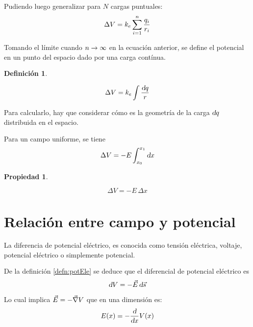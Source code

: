 \documentclass[a5paper,12pt,twoside]{book}
\newtheorem{defn}{{Definición}}[chapter]
\newtheorem{prop}{{Propiedad}}[chapter]
\begin{document}
Pudiendo luego generalizar para $N$ cargas puntuales:
\begin{equation}
    \Delta V = k_e \sum_{i=1}^n \frac{q_i}{r_i}
\end{equation}

Tomando el límite cuando $n\to\infty$ en la ecuación anterior, se define el potencial en un punto del espacio dado por una carga contínua.

\begin{mdframed}[style=MyFrame1]
    \begin{defn}
    \end{defn}
    \begin{equation*}
        \Delta V = k_e \int \frac{\textsl{d} q}{r}
    \end{equation*}
\end{mdframed}

Para calcularlo, hay que considerar cómo es la geometría de la carga $\textsl{d} q$ distribuida en el espacio.

Para un campo uniforme, se tiene
\begin{equation*}
    \Delta V = - E \int_{x_0}^{x_1} \textsl{d} x
\end{equation*}

\begin{mdframed}[style=MyFrame1]
    \begin{prop}
    \end{prop}
    \begin{equation*}
        \Delta V = - E \, \Delta x
    \end{equation*}
\end{mdframed}


\section{Relación entre campo y potencial}

La diferencia de potencial eléctrico, es conocida como tensión eléctrica, voltaje, potencial eléctrico o simplemente potencial.

De la definición \ref{defn:potEle} se deduce que el diferencial de potencial eléctrico es
\begin{equation*}
    \textsl{d} V = - \Vec{E} \, \textsl{d} \Vec{s}
\end{equation*}

Lo cual implica $\Vec{E} = - \Vec{\nabla} V$ que en una dimensión es:
\begin{equation*}
    E(x) = - \frac{\textsl{d}}{\textsl{d} x} V(x)
\end{equation*}
\end{document}
